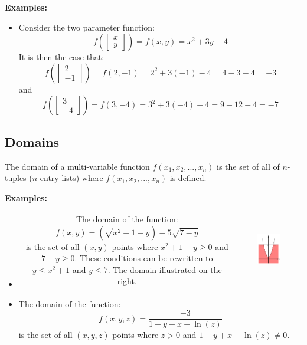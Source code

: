 \documentclass{article}
\begin{document}
\textbf{Examples:}
\begin{itemize}
\item Consider the two parameter function:
\[f\left(\begin{bmatrix} x \\ y \end{bmatrix}\right) = f(x, y) = x^2 + 3y - 4\]
It is then the case that:
\[f\left(\begin{bmatrix} 2 \\ -1 \end{bmatrix}\right) = f(2, -1) = 2^2 + 3(-1) - 4
= 4 - 3 - 4 = -3\]
and
\[f\left(\begin{bmatrix} 3 \\ -4 \end{bmatrix}\right) = f(3, -4) = 3^2 + 3(-4) - 4
= 9 - 12 - 4 = -7\]
\end{itemize}



\subsection*{Domains}

The domain of a multi-variable function \(f(x_1, x_2, ..., x_n)\) is the set of all of \(n\)-tuples (\(n\) entry lists) where \(f(x_1, x_2, ..., x_n)\) is defined. 

\textbf{Examples:}
\begin{itemize} 
\item 
\begin{tabular}{cc}
\parbox{0.6\textwidth}{
The domain of the function:
\[f(x, y) = \left(\sqrt{x^2 + 1 - y}\right) - 5\sqrt{7 - y}\]   
is the set of all \((x, y)\) points where \(x^2 + 1 - y \geq 0\) and \(7 - y \geq 0\). These conditions can be rewritten to \(y \leq x^2 + 1\) and \(y \leq 7\). The domain illustrated on the right.
} & \parbox{0.4\textwidth}{
\includegraphics[width = 0.4\textwidth]{two_variable_domain_example_1}
}   
\end{tabular}
\item   
The domain of the function:
\[f(x, y, z) = \frac{-3}{1 - y + x - \ln(z)}\]   
is the set of all \((x, y, z)\) points where \(z > 0\) and \(1 - y + x - \ln(z) \neq 0\). 
\end{itemize}
\end{document}

